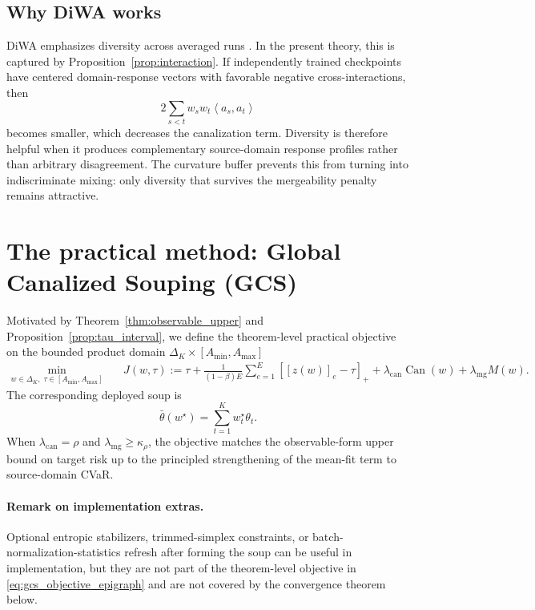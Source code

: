 \documentclass[11pt]{article}
\newcommand{\1}{\mathbf{1}}
\newcommand{\ip}[2]{\left\langle #1, #2 \right\rangle}
\newcommand{\Dset}{\Delta_K}
\theoremstyle{plain}
\theoremstyle{definition}
\theoremstyle{remark}
\begin{document}
\subsection*{Why DiWA works}
DiWA emphasizes diversity across averaged runs \cite{rame2022diwa}. In the present theory, this is captured by Proposition~\ref{prop:interaction}. If independently trained checkpoints have centered domain-response vectors with favorable negative cross-interactions, then
\[
2\sum_{s<t} w_s w_t \ip{a_s}{a_t}
\]
becomes smaller, which decreases the canalization term. Diversity is therefore helpful when it produces complementary source-domain response profiles rather than arbitrary disagreement. The curvature buffer prevents this from turning into indiscriminate mixing: only diversity that survives the mergeability penalty remains attractive.


\section{The practical method: Global Canalized Souping (GCS)}
Motivated by Theorem~\ref{thm:observable_upper} and Proposition~\ref{prop:tau_interval}, we define the theorem-level practical objective on the bounded product domain $\Dset \times [A_{\min},A_{\max}]$
\begin{equation}\label{eq:gcs_objective_epigraph}
\boxed{
\begin{aligned}
\min_{w \in \Dset,\; \tau \in [A_{\min},A_{\max}] }\quad
&J(w,\tau) := \tau + \frac{1}{(1-\beta)E}\sum_{e=1}^E [ [z(w)]_e - \tau ]_+
+ \lambda_{\mathrm{can}}\operatorname{Can}(w)
+ \lambda_{\mathrm{mg}}M(w).
\end{aligned}}
\end{equation}
The corresponding deployed soup is
\[
\bar\theta(w^\star) = \sum_{t=1}^K w_t^\star \theta_t.
\]
When $\lambda_{\mathrm{can}} = \rho$ and $\lambda_{\mathrm{mg}} \ge \kappa_{\rho}$, the objective matches the observable-form upper bound on target risk up to the principled strengthening of the mean-fit term to source-domain CVaR.

\paragraph{Remark on implementation extras.}
Optional entropic stabilizers, trimmed-simplex constraints, or batch-normalization-statistics refresh after forming the soup can be useful in implementation, but they are not part of the theorem-level objective in \eqref{eq:gcs_objective_epigraph} and are not covered by the convergence theorem below.
\end{document}
